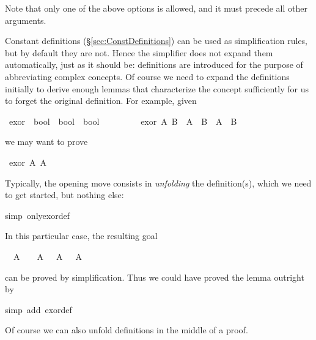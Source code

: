 \begin{isabellebody}
\begin{isamarkuptext}
Note that only one of the above options is allowed, and it must precede all
other arguments.%
\end{isamarkuptext}%
%
%
\begin{isamarkuptext}%
Constant definitions (\S\ref{sec:ConstDefinitions}) can
be used as simplification rules, but by default they are not.  Hence the
simplifier does not expand them automatically, just as it should be:
definitions are introduced for the purpose of abbreviating complex
concepts. Of course we need to expand the definitions initially to derive
enough lemmas that characterize the concept sufficiently for us to forget the
original definition. For example, given%
\end{isamarkuptext}%
\ exor\ {\isacharcolon}{\isacharcolon}\ {\isachardoublequote}bool\ {\isasymRightarrow}\ bool\ {\isasymRightarrow}\ bool{\isachardoublequote}\isanewline
\ \ \ \ \ \ \ \ \ {\isachardoublequote}exor\ A\ B\ {\isasymequiv}\ {\isacharparenleft}A\ {\isasymand}\ {\isasymnot}B{\isacharparenright}\ {\isasymor}\ {\isacharparenleft}{\isasymnot}A\ {\isasymand}\ B{\isacharparenright}{\isachardoublequote}%
\begin{isamarkuptext}%
\noindent
we may want to prove%
\end{isamarkuptext}%
\ {\isachardoublequote}exor\ A\ {\isacharparenleft}{\isasymnot}A{\isacharparenright}{\isachardoublequote}%
\begin{isamarkuptxt}%
\noindent
Typically, the opening move consists in \emph{unfolding} the definition(s), which we need to
get started, but nothing else:%
\end{isamarkuptxt}%
simp\ only{\isacharcolon}exor{\isacharunderscore}def{\isacharparenright}%
\begin{isamarkuptxt}%
\noindent
In this particular case, the resulting goal
\begin{isabelle}%
\ {}{\isachardot}\ A\ {\isasymand}\ {\isasymnot}\ {\isasymnot}\ A\ {\isasymor}\ {\isasymnot}\ A\ {\isasymand}\ {\isasymnot}\ A%
\end{isabelle}
can be proved by simplification. Thus we could have proved the lemma outright by%
\end{isamarkuptxt}%
simp\ add{\isacharcolon}\ exor{\isacharunderscore}def{\isacharparenright}%
\begin{isamarkuptext}%
\noindent
Of course we can also unfold definitions in the middle of a proof.


\end{isamarkuptext}
\end{isabellebody}

